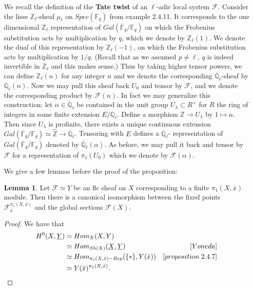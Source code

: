 \documentclass{ucbthesis}
\theoremstyle{definition}
\theoremstyle{theorem}
\newtheorem{lem}[thm]{Lemma}
\begin{document}
We recall the definition of the \textbf{Tate twist} of an $\ell$-adic local system $\mathcal{F}$. Consider the lisse $\mathbb{Z}_{\ell}$-sheaf $\mu_{\ell}$ on $Spec(\mathbb{F}_{q})$ from example 2.4.11. It corresponds to the one dimensional $\mathbb{Z}_{\ell}$ representation of $Gal(\overline{\mathbb{F}}_{q}/\mathbb{F}_{q})$ on which the Frobenius substitution acts by multiplication by $q$, which we denote by $\mathbb{Z}_{\ell}(1)$. We denote the dual of this representation by $\mathbb{Z}_{\ell}(-1)$, on which the Frobenius substitution acts by multiplication by $1/q$. (Recall that as we assumed $p\neq \ell$, $q$ is indeed invertible in $\mathbb{Z}_{\ell}$ and this makes sense.) Thus by taking higher tensor powers, we can define $\mathbb{Z}_{\ell}(n)$ for any integer $n$ and we denote the corresponding $\overline{\mathbb{Q}}_{\ell}$-sheaf by $\mathbb{Q}_{\ell}(n)$. Now we may pull this sheaf back $U_{0}$ and tensor by $\mathcal{F}$, and we denote the corresponding product by $\mathcal{F}(n)$. In fact we may generalize this construction: let $\alpha\in \overline{\mathbb{Q}}_{\ell}$ be contained in the unit group $U_{\lambda}\subset R^{\times}$ for $R$ the ring of integers in some finite extension $E/\mathbb{Q}_{\ell}$. Define a morphism $\mathbb{Z} \rightarrow U_{\lambda}$ by $1\mapsto \alpha$. Then since $U_{\lambda}$ is profinite, there exists a unique continuous extension $Gal(\overline{\mathbb{F}}_{q}/\mathbb{F}_{q}) \simeq \hat{\mathbb{Z}}\rightarrow \overline{\mathbb{Q}}_{\ell}$. Tensoring with $E$ defines a $\overline{\mathbb{Q}}_{\ell}$- representation of $Gal(\overline{\mathbb{F}}_{q}/\mathbb{F}_{q})$ denoted by $\overline{\mathbb{Q}}_{\ell}(\alpha)$. As before, we may pull it back and tensor by $\mathcal{F}$ for a representation of $\pi_{1}(U_{0})$ which we denote by $\mathcal{F}(\alpha)$.


We give a few lemmas before the proof of the proposition:

\begin{lem}
Let $\mathcal{F} \simeq \underline{Y}$ be an flc sheaf on $X$ corresponding to a finite $\pi_{1}(X,\bar{x})$ module. Then there is a canonical isomorphism between the fixed points $\mathcal{F}_{\bar{x}}^{\pi_{1}(X,\bar{x})}$ and the global sections $\mathcal{F}(X)$.
\end{lem}
\begin{proof}
We have that 
\begin{align*}
H^{0}(X,\underline{Y}) &= Hom_{X}(X,Y) \\
 &\simeq Hom_{Sh(X)}(\underline{X},\underline{Y}) & [Yoneda]\\
 &\simeq Hom_{\pi_{1}(X,\bar{x})-Rep}(\{*\},Y(\bar{x})) & [proposition \hspace{1mm} 2.4.7] \\
 &\simeq Y(\bar{x})^{\pi_{1}(X,\bar{x})}.  
\end{align*}
\end{proof}
\end{document}
